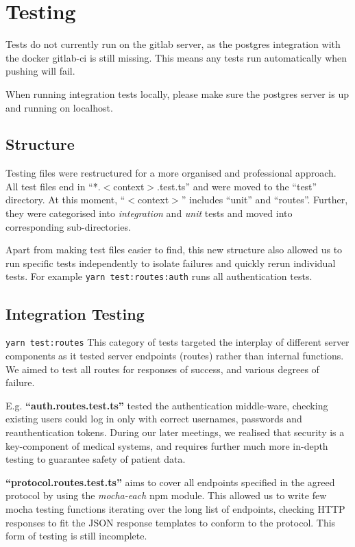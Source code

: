 \section{Testing}
Tests do not currently run on the gitlab server, as the postgres integration with the docker gitlab-ci is still missing. This means any tests run automatically when pushing will fail. \par
When running integration tests locally, please make sure the postgres server is up and running on localhost.
\subsection{Structure}
Testing files were restructured for a more organised and professional approach. All test files end in ``*.\(<\)context\(>\).test.ts'' and were moved to the ``test'' directory. At this moment, ``\(<\)context\(>\)'' includes ``unit'' and ``routes''. Further, they were categorised into \textit{integration} and \textit{unit} tests and moved into corresponding sub-directories.  \par
Apart from making test files easier to find, this new structure also allowed us to run specific tests independently to isolate failures and quickly rerun individual tests. For example \texttt{yarn test:routes:auth} runs all authentication tests.
\subsection{Integration Testing}
\texttt{yarn test:routes}
This category of tests targeted the interplay of different server components as it tested server endpoints (routes) rather than internal functions. We aimed to test all routes for responses of success, and various degrees of failure. \par
E.g. \textbf{``auth.routes.test.ts''} tested the authentication middle-ware, checking existing users could log in only with correct usernames, passwords and reauthentication tokens. During our later meetings, we realised that security is a key-component of medical systems, and requires further much more in-depth testing to guarantee safety of patient data. \par
\textbf{``protocol.routes.test.ts''} aims to cover all endpoints specified in the agreed protocol by using the \textit{mocha-each} npm module. This allowed us to write few mocha testing functions iterating over the long list of endpoints, checking HTTP responses to fit the JSON response templates to conform to the protocol. This form of testing is still incomplete.
